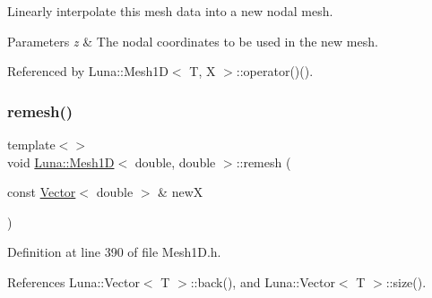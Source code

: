 Linearly interpolate this mesh data into a new nodal mesh. 


\begin{DoxyParams}{Parameters}
{\em z} & The nodal coordinates to be used in the new mesh. \\
\hline
\end{DoxyParams}


Referenced by Luna\+::\+Mesh1\+D$<$ T, X $>$\+::operator()().

\mbox{\label{classLuna_1_1Mesh1D_a2648e36fd6dc8c769501a775347281b6}} 
\subsubsection{\texorpdfstring{remesh()}{remesh()}\hspace{0.1cm}{\footnotesize\ttfamily [2/4]}}
{\footnotesize\ttfamily template$<$$>$ \\
void \hyperlink{classLuna_1_1Mesh1D}{Luna\+::\+Mesh1D}$<$ double, double $>$\+::remesh (\begin{DoxyParamCaption}\item[{const \hyperlink{classLuna_1_1Vector}{Vector}$<$ double $>$ \&}]{newX }\end{DoxyParamCaption})\hspace{0.3cm}{\ttfamily [inline]}}



Definition at line 390 of file Mesh1\+D.\+h.



References Luna\+::\+Vector$<$ T $>$\+::back(), and Luna\+::\+Vector$<$ T $>$\+::size().


